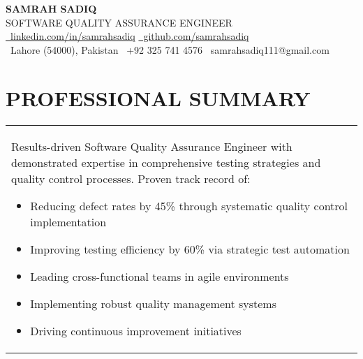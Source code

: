 \documentclass[11pt,a4paper]{article}
\begin{document}
\begin{center}
{\huge\bfseries\color{primary}SAMRAH SADIQ}\\[0.4cm]
{\Large\textcolor{secondary}{SOFTWARE QUALITY ASSURANCE ENGINEER}}\\[0.3cm]
{\small\href{https://linkedin.com/in/samrahsadiq}{\faLinkedin\ linkedin.com/in/samrahsadiq} \textbar{} 
\href{https://github.com/samrahsadiq}{\faGithub\ github.com/samrahsadiq}}\\[0.4cm]

{\small
\faMapMarker\ Lahore (54000), Pakistan \textbar{} 
\faMobile\ +92 325 741 4576 \textbar{} 
\faEnvelope\ samrahsadiq111@gmail.com}
\end{center}

\section*{PROFESSIONAL SUMMARY}
\begin{tabularx}{\textwidth}{>{\raggedright\arraybackslash}X}
Results-driven Software Quality Assurance Engineer with demonstrated expertise in comprehensive testing strategies and quality control processes. Proven track record of:
\begin{itemize}[leftmargin=*,nosep,itemsep=3pt]
\item Reducing defect rates by 45\% through systematic quality control implementation
\item Improving testing efficiency by 60\% via strategic test automation
\item Leading cross-functional teams in agile environments
\item Implementing robust quality management systems
\item Driving continuous improvement initiatives
\end{itemize}
\end{tabularx}
\end{document}
